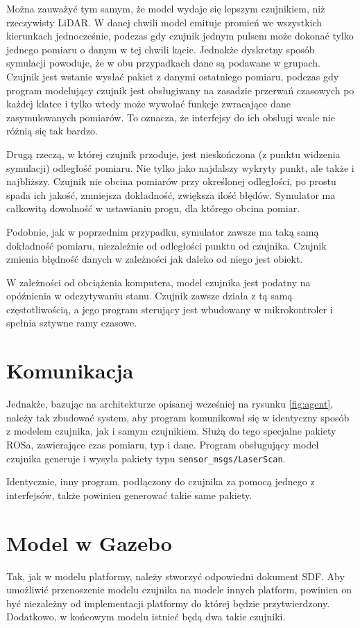 	Można zauważyć tym samym, że model wydaje się lepszym czujnikiem, niż rzeczywisty LiDAR.
	W danej chwili model emituje promień we wszystkich kierunkach jednocześnie, podczas gdy czujnik jednym pulsem może dokonać tylko jednego pomiaru o danym w tej chwili kącie.
	Jednakże dyskretny sposób symulacji powoduje, że w obu przypadkach dane są podawane w grupach.
	Czujnik jest wstanie wysłać pakiet z danymi ostatniego pomiaru, podczas gdy program modelujący czujnik jest obsługiwany na zasadzie przerwań czasowych 
	po każdej klatce i tylko wtedy może wywołać funkcje zwracające dane zasymulowanych pomiarów.
	To oznacza, że interfejsy do ich obsługi wcale nie różnią się tak bardzo.

	Drugą rzeczą, w której czujnik przoduje, jest nieskończona (z punktu widzenia symulacji) odległość pomiaru.
	Nie tylko jako najdalszy wykryty punkt, ale także i najbliższy. 
	Czujnik nie obcina pomiarów przy określonej odległości, po prostu spada ich jakość, zmniejsza dokładność, zwiększa ilość błędów.
	Symulator ma całkowitą dowolność w ustawianiu progu, dla którego obcina pomiar.

	Podobnie, jak w poprzednim przypadku, symulator zawsze ma taką samą dokładność pomiaru, niezależnie od odległości punktu od czujnika.
	Czujnik zmienia błędność danych w zależności jak daleko od niego jest obiekt.

	W zależności od obciążenia komputera, model czujnika jest podatny na opóźnienia w odczytywaniu stanu.
	Czujnik zawsze działa z tą samą częstotliwością, a jego program sterujący jest wbudowany w mikrokontroler i spełnia sztywne ramy czasowe.

\section{Komunikacja}
	Jednakże, bazując na architekturze opisanej wcześniej na rysunku \ref{fig:agent}, należy tak zbudować system, aby program komunikował się w identyczny sposób z 
	modelem czujnika, jak i samym czujnikiem.
	Służą do tego specjalne pakiety ROSa, zawierające czas pomiaru, typ i dane.
	Program obsługujący model czujnika generuje i wysyła pakiety typu \texttt{sensor\_msgs/LaserScan}.

	Identycznie, inny program, podłączony do czujnika za pomocą jednego z interfejsów, także powinien generować takie same pakiety.

\section{Model w Gazebo}
	Tak, jak w modelu platformy, należy stworzyć odpowiedni dokument SDF. 
	Aby umożliwić przenoszenie modelu czujnika na modele innych platform, powinien on być niezależny od implementacji platformy do której będzie przytwierdzony.
	Dodatkowo, w końcowym modelu istnieć będą dwa takie czujniki.

